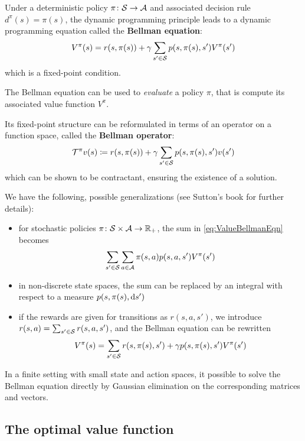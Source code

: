 \documentclass[../course-notes.tex]{subfiles}
\begin{document}
Under a deterministic policy $\pi\colon \mathcal{S} \to \mathcal{A}$ and associated decision rule $d^\pi(s) = \pi(s)$, the dynamic programming principle leads to a dynamic programming equation called the \textbf{\bluefont Bellman equation}:
\begin{equation}\label{eq:ValueBellmanEqn}
V^\pi(s) = r(s, \pi(s)) + \gamma\sum_{s'\in\mathcal{S}} p(s, \pi(s), s')V^\pi(s')
\end{equation}
which is a fixed-point condition.

The Bellman equation can be used to \textit{evaluate} a policy $\pi$, that is compute its associated value function $V^\pi$.

Its fixed-point structure can be reformulated in terms of an operator on a function space, called the \textbf{Bellman operator}:
\[
\mathcal{T}^\pi v(s) \coloneqq
r(s,\pi(s)) + \gamma\sum_{s'\in\mathcal{S}}p(s,\pi(s),s') v(s')
\]
which can be shown to be contractant, ensuring the existence of a solution.


\begin{remark}
	We have the following, possible generalizations (see Sutton's book \cite[][chap.\ 3,4]{Sutton1998} for further details):
	\begin{itemize}
		\item for stochastic policies $\pi\colon \mathcal{S}\times\mathcal{A} \to \mathbb{R}_+$, the sum in \cref{eq:ValueBellmanEqn} becomes 
		\[
		\sum_{s'\in\mathcal{S}} \sum_{a\in\mathcal{A}} \pi(s,a) p(s,a,s')V^\pi(s')
		\]
		\item in non-discrete state spaces, the sum can be replaced by an integral with respect to a measure $p(s,\pi(s),\operatorname{d\!}{} s')$
		\item if the rewards are given for transitions as $r(s,a,s')$, we introduce $r(s,a) = \sum_{s'\in\mathcal{S}}r(s,a,s')$, and the Bellman equation can be rewritten
		\[
		V^\pi(s) = \sum_{s'\in\mathcal{S}}
		r(s,\pi(s),s') + \gamma p(s,\pi(s),s')V^\pi(s')
		\]
	\end{itemize}
\end{remark}


In a finite setting with small state and action spaces, it possible to solve the Bellman equation directly by Gaussian elimination on the corresponding matrices and vectors.



\subsection{The optimal value function}\label{sec:OptimalValueFunc}
\end{document}
